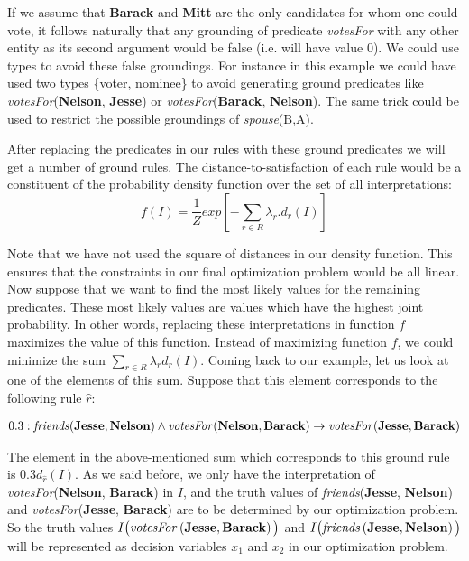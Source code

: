 \documentclass[12pt,a4paper]{article}
\begin{document}
If we assume that \textbf{Barack} and \textbf{Mitt} are the only candidates for whom one could vote, it follows naturally that any grounding of predicate \emph{\emph{votesFor}} with any other entity as its second argument would be false (i.e. will have value 0). We could use types to avoid these false groundings. For instance in this example we could have used two types \{voter, nominee\} to avoid generating ground predicates like \emph{votesFor}(\textbf{Nelson}, \textbf{Jesse}) or \emph{votesFor}(\textbf{Barack}, \textbf{Nelson}). The same trick could be used to restrict the possible groundings of \emph{spouse}(B,A).

After replacing the predicates in our rules with these ground predicates we will get a number of ground rules. The distance-to-satisfaction of each rule would be a constituent of the probability density function over the set of all interpretations:
\begin{equation*}
f(I) = \frac{1}{Z} exp [ - \sum_{r \in R} \lambda_r . d_r(I)]
\end{equation*}

Note that we have not used the square of distances in our density function. This ensures that the constraints in our final optimization problem would be all linear. Now suppose that we want to find the most likely values for the remaining predicates. These most likely values are values which have the highest joint probability. In other words, replacing these interpretations in function $f$ maximizes the value of this function. Instead of maximizing function $f$, we could minimize the sum $\sum_{r \in R} \lambda_r d_r(I)$. Coming back to our example, let us look at one of the elements of this sum. Suppose that this element corresponds to the following rule $\hat{r}$:

\begin{align*}
0.3 : \text{\emph{friends}} (\text{\textbf{Jesse}},\text{\textbf{Nelson}}) \land \text{\emph{votesFor}}(\text{\textbf{Nelson}},\text{\textbf{Barack}}) \to \text{\emph{votesFor}}(\text{\textbf{Jesse}},\text{\textbf{Barack}}) \\
\end{align*}

The element in the above-mentioned sum which corresponds to this ground rule is $0.3 d_{\hat{r}} (I)$. As we said before, we only have the interpretation of \emph{votesFor}(\textbf{Nelson}, \textbf{Barack}) in $I$, and the truth values of \emph{friends}(\textbf{Jesse}, \textbf{Nelson}) and \emph{votesFor}(\textbf{Jesse}, \textbf{Barack}) are to be determined by our optimization problem. So the truth values $I\big(\text{\emph{votesFor}}\left(\text{\textbf{Jesse}},\text{\textbf{Barack}}\right)\big)$ and $I\big(\text{\emph{friends}}\left(\text{\textbf{Jesse}},\text{\textbf{Nelson}}\right)\big)$ will be represented as decision variables $x_1$ and $x_2$ in our optimization problem. 
\end{document}

